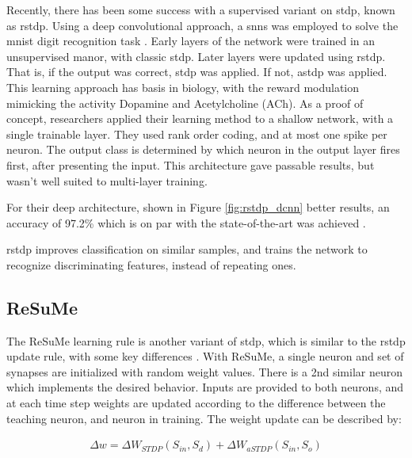     Recently, there has been some success with a supervised variant on
    \gls{stdp}, known as \gls{rstdp}. Using a deep convolutional approach, a
    \glspl{snn} was employed to solve the \gls{mnist} digit recognition task
    \parencite{mozafari_2018}. Early layers of the network were trained in an
    unsupervised manor, with classic \gls{stdp}. Later layers were updated using
    \gls{rstdp}. That is, if the output was correct, \gls{stdp}
    was applied. If not, \gls{astdp} was applied. This learning approach has
    basis in biology, with the reward modulation mimicking the activity Dopamine
    and Acetylcholine (ACh). As a proof of concept, researchers applied their
    learning method to a shallow network, with a single trainable layer. They
    used rank order coding, and at most one spike per neuron. The output class
    is determined by which neuron in the output layer fires first, after
    presenting the input. This architecture gave passable results, but wasn't
    well suited to multi-layer training.
    
    For their deep architecture, shown in Figure \ref{fig:rstdp_dcnn} better
    results, an accuracy of 97.2\% which is on par with the state-of-the-art was
    achieved \parencite{mozafari_2018}.
    

    \Gls{rstdp} improves classification on similar samples, and trains the network to
    recognize discriminating features, instead of repeating ones.

    \subsection{ReSuMe}
    The ReSuMe learning rule is another variant of \gls{stdp}, which is similar
    to the \gls{rstdp} update rule, with some key differences
    \parencite{mozafari_2018}. With ReSuMe, a single neuron and set of synapses are
    initialized with random weight values. There is a 2nd similar neuron
    which implements the desired behavior. Inputs are provided to both neurons,
    and at each time step weights are updated according to the difference
    between the teaching neuron, and neuron in training. The weight update can
    be described by:

    \begin{align}
      \Delta w = \Delta W_{STDP}(S_{in}, S_{d}) + \Delta W_{aSTDP}(S_{in}, S_{o}) \label{eq:resume_stdp}
    \end{align}

